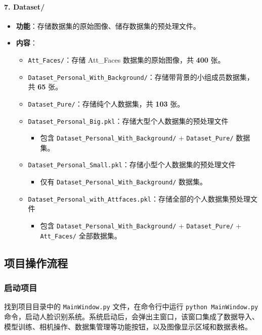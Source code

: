 \documentclass{article}
\begin{document}
\paragraph{7. Dataset/}
\begin{itemize}
    \item \textbf{功能}：存储数据集的原始图像、储存数据集的预处理文件。
    \item \textbf{内容}：
    \begin{itemize}
        \item \texttt{Att\_Faces/}：存储 Att\_Faces 数据集的原始图像，共 \textbf{400} 张。
        \item \texttt{Dataset\_Personal\_With\_Background/}：存储带背景的小组成员数据集，共 \textbf{65} 张。
        \item \texttt{Dataset\_Pure/}：存储纯个人数据集，共 \textbf{103} 张。
        \item \texttt{Dataset\_Personal\_Big.pkl}：存储大型个人数据集的预处理文件
        \begin{itemize}
            \item 包含 \texttt{Dataset\_Personal\_With\_Background/} + \texttt{Dataset\_Pure/} 数据集。
        \end{itemize}
            \item \texttt{Dataset\_Personal\_Small.pkl}：存储小型个人数据集的预处理文件
        \begin{itemize}
            \item 仅有 \texttt{Dataset\_Personal\_With\_Background/} 数据集。
        \end{itemize}
        \item \texttt{Dataset\_Personal\_with\_Attfaces.pkl}：存储全部的个人数据集预处理文件
        \begin{itemize}
            \item 包含 \texttt{Dataset\_Personal\_With\_Background/} + \texttt{Dataset\_Pure/} + \texttt{Att\_Faces/} 全部数据集。
        \end{itemize}
    \end{itemize}
\end{itemize}

\subsection{项目操作流程}

\subsubsection{启动项目}
找到项目目录中的 \texttt{MainWindow.py} 文件，在命令行中运行 \texttt{python MainWindow.py} 命令，启动人脸识别系统。系统启动后，会弹出主窗口，该窗口集成了数据导入、模型训练、相机操作、数据集管理等功能按钮，以及图像显示区域和数据表格。
\end{document}
